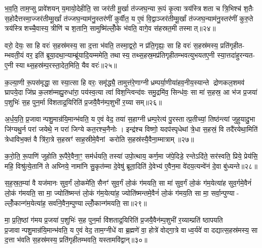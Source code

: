भ॒व॒ति॒ ताम॒प्सु प्रावे॑शयन् य॒मायो॒देहीति॒ सा जर॑ती मू॒र्खा त॑ज्जघ॒न्या रू॒पं कृ॒त्वा त्रय॑स्त्रिशता च त्रि॒भिश्च॑ श॒तैः स॒होदैत्तस्मा॒ज्जर॑तीम्मू॒र्खां त॑ज्जघ॒न्याम॑नु॒स्तर॑णीं कुर्वीत॒ य ए॒वं वि॒द्वाञ्जर॑तीम्मू॒र्खां त॑ज्जघ॒न्याम॑नु॒स्तर॑णीं कुरु॒ते त्रय॑स्त्रिशच्चै॒वास्य॒ त्रीणि॑ च श॒तानि॒ सामुष्मि॑ल्लोँ॒के भ॑वति॒ वागे॒व स॑हस्रत॒मी तस्मात्॥२४॥

वरो॒ देयः॒ सा हि वरः॑ स॒हस्र॑मस्य॒ सा द॒त्ता भ॑वति॒ तस्मा॒द्वरो॒ न प्र॑ति॒गृह्यः॒ सा हि वरः॑ स॒हस्र॑मस्य॒ प्रति॑गृहीत- म्भवती॒यं वर॒ इति॑ ब्रूया॒दथा॒न्याम्ब्रू॑यादि॒यम्ममेति॒ तथास्य॒ तथ्स॒हस्र॒मप्र॑तिगृहीतम्भवत्युभयतए॒नी स्या॒त्तदा॑हुरन्यत- ए॒नी स्याथ्स॒हस्र॑म्प॒रस्ता॒देत॒मिति॒ यैव वरः॑॥२५॥

क॒ल्या॒णी रू॒पस॑मृद्धा॒ सा स्या॒त्सा हि वरः॒ समृ॑द्ध्यै॒ तामुत्त॑रे॒णाग्नीध्रम्पर्या॒णीया॑हव॒नीय॒स्यान्ते द्रोणकल॒शमव॑ घ्रापये॒दा जि॑घ्र क॒लश॑म्मह्यु॒रुधा॑रा॒ पय॑स्व॒त्या त्वा॑ विश॒न्त्विन्द॑वः समु॒द्रमि॑व॒ सिन्ध॑वः॒ सा मा॑ स॒हस्र॒ आ भ॑ज प्र॒जया॑ प॒शुभिः॑ स॒ह पुन॒र्मा वि॑शताद्र॒यिरिति॑ प्र॒जयै॒वैन॑म्प॒शुभी॑ र॒य्या सम्॥२६॥

अ॒र्ध॒य॒ति॒ प्र॒जावान्पशु॒मान्र॑यि॒मान्भ॑वति॒ य ए॒वं वेद॒ तया॑ स॒हाग्नीध्रम्प॒रेत्य॑ पु॒रस्तात्प्र॒तीच्यां॒ तिष्ठ॑न्त्यां जुहुयादु॒भा जि॑ग्यथु॒र्न परा॑ जयेथे॒ न परा॑ जिग्ये कत॒रश्च॒नैनोः। इन्द्र॑श्च विष्णो॒ यदप॑स्पृधेथां त्रे॒धा स॒हस्रं॒ वि तदै॑रयेथा॒मिति॑ त्रेधाविभ॒क्तं वै त्रि॑रा॒त्रे स॒हस्रꣳ॑ साह॒स्रीमे॒वैनां करोति स॒हस्र॑स्यै॒वैना॒म्मात्राम्॥२७॥

क॒रो॒ति॒ रू॒पाणि॑ जुहोति रू॒पैरे॒वैना॒ꣳ॒ सम॑र्धयति॒ तस्या॑ उपो॒त्थाय॒ कर्ण॒मा ज॑पे॒दिडे॒ रन्तेऽदि॑ते॒ सर॑स्वति॒ प्रिये॒ प्रेय॑सि॒ महि॒ विश्रु॑त्ये॒तानि॑ ते अघ्निये॒ नामा॑नि सु॒कृत॑म्मा दे॒वेषु॑ ब्रूता॒दिति॑ दे॒वेभ्य॑ ए॒वैन॒मा वे॑दय॒त्यन्वे॑नं दे॒वा बु॑ध्यन्ते॥२८॥

{\anuvakamend[{ए॒तदे॒तस्यां वी॒र्य॑मस्य त्रि॒भिश्च॑ द॒त्ता स॑हस्रत॒मी तस्मा॑दे॒व वर॒स्सम्मात्रा॒मेका॒न्नच॑त्वारि॒ꣳ॒शच्च॑॥६॥}]}

स॒ह॒स्र॒त॒म्या॑ वै यज॑मानः सुव॒र्गं लो॒कमे॑ति॒ सैनꣳ॑ सुव॒र्गं लो॒कं ग॑मयति॒ सा मा॑ सुव॒र्गं लो॒कं ग॑म॒येत्या॑ह सुव॒र्गमे॒वैनं॑ लो॒कं ग॑मयति॒ सा मा॒ ज्योति॑ष्मन्तं लो॒कं ग॑म॒येत्या॑ह॒ ज्योति॑ष्मन्तमे॒वैनं॑ लो॒कं ग॑मय॒ति सा मा॒ सर्वा॒न्पुण्या- ल्लोँ॒कान्ग॑म॒येत्या॑ह॒ सर्वा॑ने॒वैन॒म्पुण्याल्लोँ॒कान्ग॑मयति॒ सा॥२९॥

मा॒ प्र॒ति॒ष्ठां ग॑मय प्र॒जया॑ प॒शुभिः॑ स॒ह पुन॒र्मा वि॑शताद्र॒यिरिति॑ प्र॒जयै॒वैन॑म्प॒शुभी॑ र॒य्याम्प्रति॑ ष्ठापयति प्र॒जावान्पशु॒मान्र॑यि॒मान्भ॑वति॒ य ए॒वं वेद॒ ताम॒ग्नीधे॑ वा ब्र॒ह्मणे॑ वा॒ होत्रे॑ वोद्गा॒त्रे वाध्व॒र्यवे॑ वा दद्यात्स॒हस्र॑मस्य॒ सा द॒त्ता भ॑वति स॒हस्र॑मस्य॒ प्रति॑गृहीतम्भवति॒ यस्तामवि॑द्वान्॥३०॥

